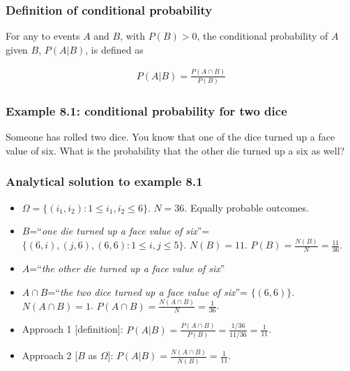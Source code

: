 \begin{frame}
    \frametitle{Definition of conditional probability}

    \begin{probDef}

		For any to events $A$ and $B$, with $P(B)>0$, the conditional
probability of $A$ given $B$, $P(A|B)$, is defined as 

		\begin{align*}
			P(A|B)=\frac{P(A\cap B)}{P(B)}
		\end{align*}

	\end{probDef}

\end{frame}

\begin{frame}
    \frametitle{Example 8.1: conditional probability for two dice}

	\begin{manualProbExample}{8.1}
		Someone has rolled two dice. You know that one of the dice turned up a
face value of six. What is the probability that the other die turned up a six
as  well?
	\end{manualProbExample}

\end{frame}

\begin{frame}
    \frametitle{Analytical solution to example 8.1}

    \begin{itemize}[<+->]

		\item $\Omega=\{(i_1,i_2): 1\le i_1,i_2\le6\}$. $N=36$. Equally probable outcomes.

		\item $B$=``\textit{one die turned up a face value of six}''=
$\{(6,i),(j,6),(6,6):1\le i,j\le 5\}$. $N(B)=11$. $P(B)=\frac{N(B)}{N}=\frac{11}{36}$.

		\item $A$=``\textit{the other die turned up a face value of six}''

		\item $A\cap B$=``\textit{the two dice turned up a face value of six}''=
$\{(6,6)\}$. $N(A\cap B)=1$. $P(A\cap B)=\frac{N(A\cap B)}{N}=\frac{1}{36}$.

		\item Approach 1 [definition]: $P(A|B)=\frac{P(A\cap B)}{P(B)}=\frac{1/36}{11/36}=\frac{1}{11}$.

		\item Approach 2 [$B$ as $\Omega$]: $P(A|B)=\frac{N(A\cap B)}{N(B)}=\frac{1}{11}$.

    \end{itemize}

\end{frame}

